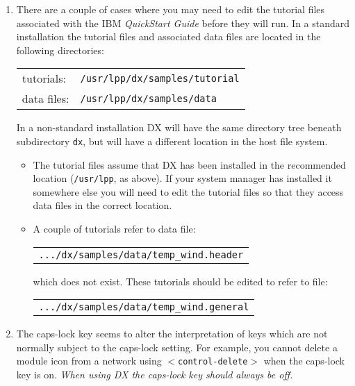 \begin{enumerate}

  \item There are a couple of cases where you may need to edit the
   tutorial files associated with the IBM {\it QuickStart
   Guide}\cite{QUICKS} before they will run. In a standard installation
   the tutorial files and associated data files are located in the
   following directories:

  \begin{tabular}{ll}
   tutorials:   &  {\tt /usr/lpp/dx/samples/tutorial} \\
   data files:  &  {\tt /usr/lpp/dx/samples/data} \\
  \end{tabular}

   In a non-standard installation DX will have the same directory tree
   beneath subdirectory {\tt dx}, but will have a different location
   in the host file system.

  \begin{itemize}

    \item The tutorial files assume that DX has been installed in the
     recommended location ({\tt{/usr/lpp}}, as above). If your system
     manager has installed it somewhere else you will need to edit
     the tutorial files so that they access data files in the correct
     location.

    \item A couple of tutorials refer to data file:

    \begin{tabular}{l}
     {\tt .../dx/samples/data/temp\_wind.header} \\
    \end{tabular}

     which does not exist. These tutorials should be edited to refer
     to file:

    \begin{tabular}{l}
     {\tt .../dx/samples/data/temp\_wind.general} \\
    \end{tabular}

  \end{itemize}

  \item The caps-lock key seems to alter the interpretation of keys
   which are not normally subject to the caps-lock setting. For example,
   you cannot delete a module icon from a network using
   {\tt{$<$control-delete$>$}} when the caps-lock key is on. {\it When using
   DX the caps-lock key should always be off.}


\end{enumerate}
